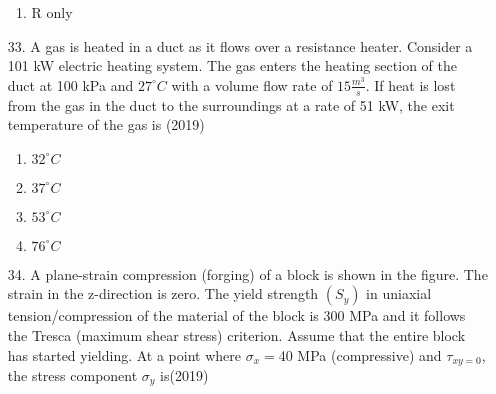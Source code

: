 \documentclass[journal]{IEEEtran}
\begin{document}
\begin{enumerate}
\begin{enumerate}[label=(\Alph*)]
        \item R only 
    \end{enumerate}
    \item[33.] A gas is heated in a duct as it flows over a resistance heater. Consider a 101 kW electric heating system. The gas enters the heating section of the duct at 100 kPa and $27^{\circ}C$ with a volume flow rate of $15 \frac{m^3}{s}$. If heat is lost from the gas in the duct to the surroundings at a rate of 51 kW, the exit temperature of the gas is \hfill (2019)
    \begin{enumerate}[label=(\Alph*)]
        \item $32^{\circ}C$
        \item $37^{\circ}C$
        \item $53^{\circ}C$
        \item $76^{\circ}C$
    \end{enumerate}
    \item[34.] A plane-strain compression (forging) of a block is shown in the figure. The strain in the z-direction is zero. The yield strength $(S_y)$ in uniaxial tension/compression of the material of the block is 300 MPa and it follows the Tresca (maximum shear stress) criterion. Assume that the entire block has started yielding. At a point where $\sigma_x =$40 MPa (compressive) and $\tau_{xy = 0}$,  the stress component $\sigma_y$ is\hfill (2019)
    \begin{figure}[!ht]
        \centering
\end{figure}
\end{enumerate}
\end{document}
